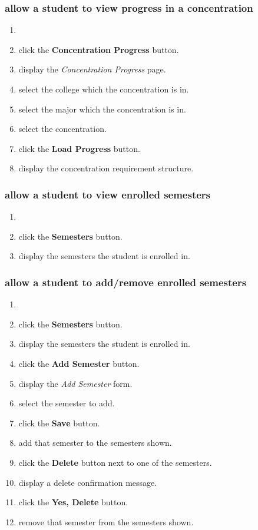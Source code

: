 \documentclass[12pt]{article}
\newenvironment{requirement}[1]
{
    \renewcommand{\thesubsubsection}{R\arabic{subsubsection}.}
    \renewcommand{\labelenumi}{
        \arabic{subsubsection}.\arabic{enumi}
    }
    \renewcommand{\labelenumii}{
        \arabic{subsubsection}.\arabic{enumi}.\arabic{enumii}
    }
    \renewcommand{\labelenumiii}{
        \arabic{subsubsection}.\arabic{enumi}.\arabic{enumii}.\arabic{enumiii}
    }
    \renewcommand{\labelenumiv}{
        \arabic{subsubsection}.\arabic{enumi}.\arabic{enumii}.\arabic{enumiii}.\arabic{enumiv}
    }
    \subsubsection{#1}
    \begin{enumerate}
}
{
    \end{enumerate}
}
\begin{document}
\begin{requirement}{\sysshall allow a student to view progress in a concentration}
    \item \mainmenu
    \item \stushall click the \textbf{Concentration Progress} button.
    \item \sysshall display the \emph{Concentration Progress} page.
    \item \stushall select the college which the concentration is in.
    \item \stushall select the major which the concentration is in.
    \item \stushall select the concentration.
    \item \stushall click the \textbf{Load Progress} button.
    \item \sysshall display the concentration requirement structure.
    \gotohome
\end{requirement}

\newcommand{\navsemesters}{
    \item \mainmenu
    \item \stushall click the \textbf{Semesters} button.
    \item \sysshall display the semesters the student is enrolled in.
}

\begin{requirement}{\sysshall allow a student to view enrolled semesters}
    \navsemesters
    \gotohome
\end{requirement}

\begin{requirement}{\sysshall allow a student to add/remove enrolled semesters}
    \navsemesters
    \item \stushall click the \textbf{Add Semester} button.
    \item \sysshall display the \emph{Add Semester} form.
    \item \stushall select the semester to add.
    \item \stushall click the \textbf{Save} button.
    \item \sysshall add that semester to the semesters shown.
    \item \stushall click the \textbf{Delete} button next to one of the semesters.
    \item \sysshall display a delete confirmation message.
    \item \stushall click the \textbf{Yes, Delete} button.
    \item \sysshall remove that semester from the semesters shown.
    \gotohome
\end{requirement}
\end{document}
